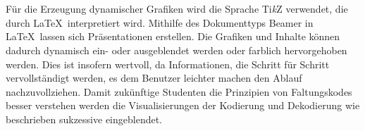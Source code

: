 \\
\\
Für die Erzeugung dynamischer Grafiken wird die Sprache Ti\textit{k}Z verwendet, die durch \LaTeX\ interpretiert wird. Mithilfe des Dokumenttyps Beamer in \LaTeX\ lassen sich Präsentationen erstellen. Die Grafiken und Inhalte können dadurch dynamisch ein- oder ausgeblendet werden oder farblich hervorgehoben werden. Dies ist insofern wertvoll, da Informationen, die Schritt für Schritt vervollständigt werden, es dem Benutzer leichter machen den Ablauf nachzuvollziehen. Damit zukünftige Studenten die Prinzipien von Faltungskodes besser verstehen werden die Visualisierungen der Kodierung und Dekodierung wie beschrieben sukzessive eingeblendet.